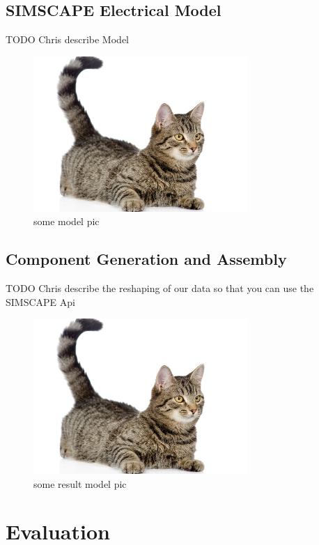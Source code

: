 \documentclass[10pt,twocolumn,letterpaper]{article}
\begin{document}
\subsection{SIMSCAPE Electrical Model}
\label{sec:sims}

TODO Chris describe Model
\par

\begin{figure}[!ht]
\includegraphics[width = 3.2in]{img/cat.jpg}
\caption{some model pic}
\label{fig:c11}
\end{figure}

\subsection{Component Generation and Assembly}
\label{sec:generation}

TODO Chris describe the reshaping of our data so that you can use the SIMSCAPE Api
\par

\begin{figure}[!ht]
\includegraphics[width = 3.2in]{img/cat.jpg}
\caption{some result model pic}
\label{fig:c12}
\end{figure}


\section{Evaluation}
\label{sec:eval}
\end{document}
